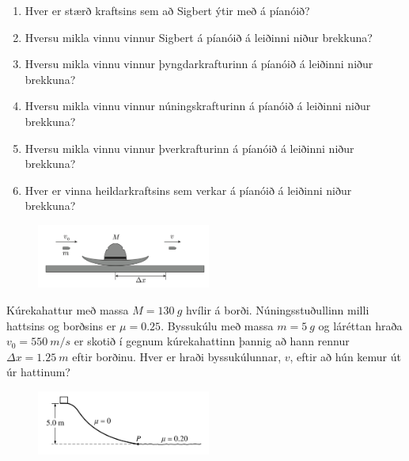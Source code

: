 \ifdefined \wholebook \else\documentclass[oneside]{book}\usepackage{EdlBook}\graphicspath{{figures/}}
\begin{document}
\begin{enumerate}[label = \textbf{Dæmi \thechapter.\arabic*.}]
\begin{minipage}{\linewidth}
\end{minipage}
    
    \begin{enumerate}[label = \textbf{(\alph*)}]
        \item Hver er stærð kraftsins sem að Sigbert ýtir með á píanóið?
        
        \item Hversu mikla vinnu vinnur Sigbert á píanóið á leiðinni niður brekkuna?
        
        \item Hversu mikla vinnu vinnur þyngdarkrafturinn á píanóið á leiðinni niður brekkuna?
        
        \item Hversu mikla vinnu vinnur núningskrafturinn á píanóið á leiðinni niður brekkuna?
        
        \item Hversu mikla vinnu vinnur þverkrafturinn á píanóið á leiðinni niður brekkuna?
        
        \item Hver er vinna heildarkraftsins sem verkar á píanóið á leiðinni niður brekkuna? 
    \end{enumerate}

    
\begin{minipage}{\linewidth}
\begin{figure}
\vspace{-0.75cm}
\includegraphics[width=2.25in]{images/hattur.png}
\end{figure}

    \item Kúrekahattur með massa $M = \SI{130}{g}$ hvílir á borði. Núningsstuðullinn milli hattsins og borðsins er $\mu = 0.25$. Byssukúlu með massa $m = \SI{5}{g}$ og láréttan hraða $v_0 = \SI{550}{m/s}$ er skotið í gegnum kúrekahattinn þannig að hann rennur $\Delta x = \SI{1.25}{m}$ eftir borðinu. Hver er hraði byssukúlunnar, $v$, eftir að hún kemur út úr hattinum?
    
\end{minipage}
    
\begin{minipage}{\linewidth}
\begin{figure}
\vspace{-1cm}
\includegraphics[width=2.25in]{images/nun.png}
\end{figure}


\end{minipage}
\end{enumerate}
\end{document}
